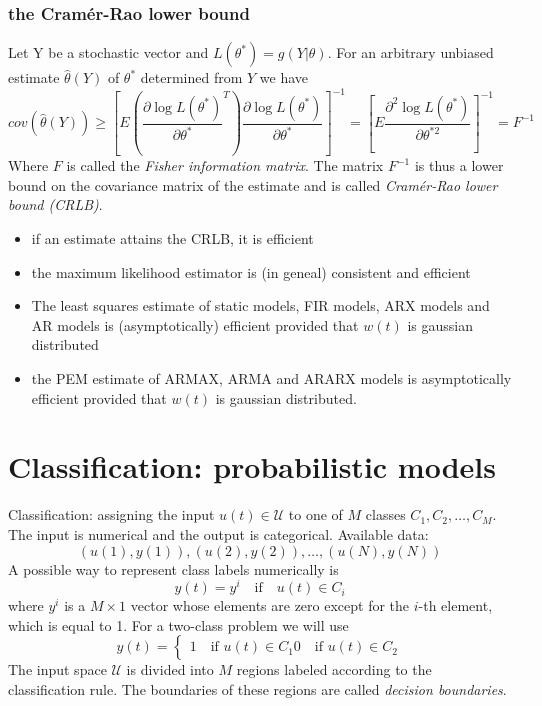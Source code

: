 \documentclass{book}
\begin{document}
\subsection{the Cramér-Rao lower bound}
Let Y be a stochastic vector and $L(\theta^*)=g(Y|\theta)$. For an arbitrary unbiased estimate $\hat{\theta}(Y)$ of $\theta^*$ determined from $Y$ we have 
\[
    cov (\hat{\theta}(Y))\geq \left[E\left(\displaystyle\frac{\partial \log L(\theta^*)}{\partial \theta^*}^T  \right)\displaystyle\frac{\partial \log L(\theta^*)}{\partial \theta^*} \right]^{-1} = \left[E\displaystyle\frac{\partial^2\log L(\theta^*) }{\partial \theta^{*2}}\right]^{-1}=F^{-1}
\]
Where $F$ is called the \emph{Fisher information matrix}. The matrix $F^{-1}$ is thus a lower bound on the covariance matrix of the estimate and is called \emph{Cramér-Rao lower bound (CRLB)}. 
\begin{itemize}
    \item if an estimate attains the CRLB, it is efficient
    \item the maximum likelihood estimator is (in geneal) consistent and efficient 
    \item The least squares estimate of static models, FIR models, ARX models and AR models is (asymptotically) efficient provided that $w(t)$ is gaussian distributed 
    \item the PEM estimate of ARMAX, ARMA and ARARX models is asymptotically efficient provided that $w(t)$ is gaussian distributed.
\end{itemize}





\chapter{Classification: probabilistic models}
Classification: assigning the input $u(t)\in \mathcal{U}$ to one of $M$ classes $C_1,C_2,\dots,C_M$. The input is numerical and the output is categorical. 
Available data: 
\[
    (u(1),y(1)),(u(2),y(2)),\dots,(u(N),y(N))
\]
A possible way to represent class labels numerically is 
\[
    y(t) = y^i \quad \text{if} \quad u(t)\in C_i
\]
where $y^i$ is a $M\times 1$ vector whose elements are zero except for the $i$-th element, which is equal to 1. For a two-class problem we will use 
\[
    y(t) = \begin{cases}
        1 \quad \text{if } u(t) \in C_1
        0 \quad \text{if } u(t) \in C_2
    \end{cases}
\]
The input space $\mathcal{U}$ is divided into $M$ regions labeled according to the classification rule. The boundaries of these regions are called \emph{decision boundaries}.
\end{document}
